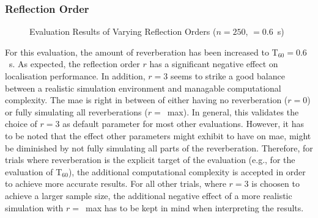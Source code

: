 \subsubsection*{Reflection Order}
\begin{figure}[H]
\iftoggle{quick}{
    \texttt{[image: plots/boxplots/boxplot-joined-reflect-order]}
}{%
    
}
	\caption[Evaluation Results of Varying Reflection Orders]{Evaluation Results of Varying Reflection Orders ($n=250$, \Tsixty$=0.6$~s)}
	\label{fig:trialR}
\end{figure}

For this evaluation, the amount of reverberation has been increased to T$_{60}=0.6$~s. As expected, the reflection order $r$ has a significant negative effect on localisation performance. In addition, $r=3$ seems to strike a good balance between a realistic simulation environment and managable computational complexity. The \gls{mae} is right in between of either having no reverberation ($r=0$) or fully simulating all reverberations ($r=$~max). In general, this validates the choice of $r=3$ as default parameter for most other evaluations. However, it has to be noted that the effect other parameters might exhibit to have on \gls{mae}, might be diminished by not fully simulating all parts of the reverberation. Therefore, for trials where reverberation is the explicit target of the evaluation (e.g., for the evaluation of T$_{60}$), the additional computational complexity is accepted in order to achieve more accurate results. For all other trials, where $r=3$ is choosen to achieve a larger sample size, the additional negative effect of a more realistic simulation with $r=$~max has to be kept in mind when interpreting the results.

